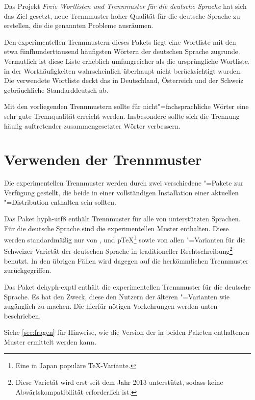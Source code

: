 \documentclass[11pt,
               DIV=9,
               toc=flat,
               captions=tableheading,
               abstract=on]{scrartcl}
\newcommand*{\Paket}[1]{\textsf{#1}}
\begin{document}
Das Projekt \emph{Freie Wortlisten und Trennmuster für die deutsche
  Sprache} hat sich das Ziel gesetzt, neue Trennmuster hoher Qualität
für die deutsche Sprache zu erstellen, die die genannten Probleme
ausräumen.

Den experimentellen Trennmustern dieses Pakets liegt eine Wortliste
mit den etwa fünfhunderttausend häufigsten Wörtern der deutschen
Sprache zugrunde.  Vermutlich ist diese Liste erheblich umfangreicher
als die ursprüngliche Wortliste, in der Worthäufigkeiten
wahrscheinlich überhaupt nicht berücksichtigt wurden.  Die verwendete
Wortliste deckt das in Deutschland, Österreich und der Schweiz
gebräuchliche Standarddeutsch ab.

Mit den vorliegenden Trennmustern sollte für nicht"=fachsprachliche
Wörter eine sehr gute Trennqualität erreicht werden.  Insbesondere
sollte sich die Trennung häufig auftretender zusammengesetzter Wörter
verbessern.


\section{Verwenden der Trennmuster}
\label{sec:verwenden}

Die experimentellen Trennmuster werden durch zwei verschiedene
"=Pakete zur Verfügung gestellt, die beide in einer
vollständigen Installation einer aktuellen "=Distribution
enthalten sein sollten.

Das Paket \Paket{hyph-utf8} enthält Trennmuster für alle von
 unterstützten Sprachen.  Für die deutsche Sprache sind
die experimentellen Muster enthalten.  Diese werden standardmäßig nur
von ,  und p\TeX\footnote{Eine in Japan
  populäre \TeX-Variante.} sowie von allen "=Varianten für
die Schweizer Varietät der deutschen Sprache in traditioneller
Rechtschreibung\footnote{Diese Varietät wird erst seit dem Jahr 2013
  unterstützt, sodass keine Abwärtskompatibilität erforderlich ist.}
benutzt.  In den übrigen Fällen wird dagegen auf die herkömmlichen
Trennmuster zurückgegriffen.

Das Paket \Paket{dehyph-exptl} enthält die experimentellen
Trennmuster für die deutsche Sprache.  Es hat den Zweck, diese den
Nutzern der älteren "=Varianten wie 
zugänglich zu machen.  Die hierfür nötigen Vorkehrungen werden unten
beschrieben.

Siehe \autoref{sec:fragen} für Hinweise, wie die Version der in beiden
Paketen enthaltenen Muster ermittelt werden kann.
\end{document}
